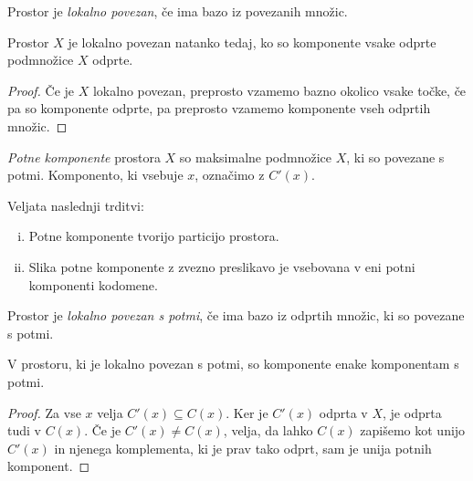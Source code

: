 \obvs


\begin{definicija}
Prostor je \emph{lokalno
povezan}, če ima bazo
iz povezanih množic.
\end{definicija}

\begin{trditev}
Prostor $X$ je lokalno povezan natanko tedaj, ko so komponente
vsake odprte podmnožice $X$ odprte.
\end{trditev}

\begin{proof}
Če je $X$ lokalno povezan, preprosto vzamemo bazno okolico vsake
točke, če pa so komponente odprte, pa preprosto vzamemo komponente
vseh odprtih množic.
\end{proof}

\begin{definicija}
\emph{Potne komponente} prostora $X$ so maksimalne podmnožice $X$,
ki so povezane s potmi. Komponento, ki vsebuje $x$, označimo z
$C'(x)$.
\end{definicija}

\begin{trditev}
Veljata naslednji trditvi:

\begin{enumerate}[i)]
\item Potne komponente tvorijo particijo prostora.
\item Slika potne komponente z zvezno preslikavo je vsebovana v
eni potni komponenti kodomene.
\end{enumerate}
\end{trditev}

\begin{definicija}
Prostor je \emph{lokalno povezan s potmi}, če ima bazo iz odprtih
množic, ki so povezane s potmi.
\end{definicija}

\begin{izrek}
V prostoru, ki je lokalno povezan s potmi, so komponente enake
komponentam s potmi.
\end{izrek}

\begin{proof}
Za vse $x$ velja $C'(x) \subseteq C(x)$. Ker je $C'(x)$ odprta v
$X$, je odprta tudi v $C(x)$. Če je $C'(x) \ne C(x)$, velja, da
lahko $C(x)$ zapišemo kot unijo $C'(x)$ in njenega komplementa, ki
je prav tako odprt, sam je unija potnih komponent.
\end{proof}


